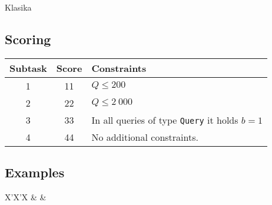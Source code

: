 \begin{statement}[
  problempoints=110,
  timelimit=1 second,
  memorylimit=512 MiB,
]{Klasika}
 \subsection*{Scoring}
{\renewcommand{\arraystretch}{1.4}
  \setlength{\tabcolsep}{6pt}
  \begin{tabular}{ccl}
 Subtask & Score & Constraints \\ \midrule
  1 & 11 & $Q \le 200$ \\
  2 & 22 & $Q \le 2\ 000$ \\
  3 & 33 & In all queries of type \texttt{Query} it holds $b=1$ \\
  4 & 44 & No additional constraints.
\end{tabular}}

\subsection*{Examples}
\begin{tabularx}{\textwidth}{X'X'X}
 &
 &
\end{tabularx}

\end{statement}

